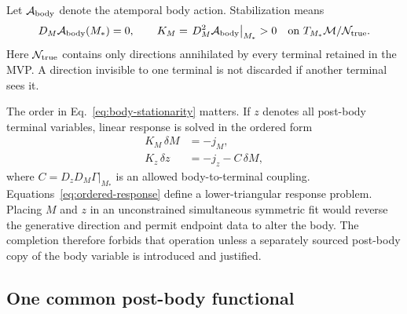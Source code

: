 \documentclass[11pt]{article}
\begin{document}
Let \(\mathcal A_{\rm body}\) denote the atemporal body action.  Stabilization
means
\begin{equation}
  D_M\mathcal A_{\rm body}(M_*)=0,
  \qquad
  K_M=\left.D_M^2\mathcal A_{\rm body}\right|_{M_*}>0
  \quad\text{on }T_{M_*}\mathcal M/\mathcal N_{\rm true}.
  \label{eq:body-stationarity}
\end{equation}
Here \(\mathcal N_{\rm true}\) contains only directions annihilated by every
terminal retained in the MVP.  A direction invisible to one terminal is not
discarded if another terminal sees it.

The order in Eq.~\eqref{eq:body-stationarity} matters.  If \(z\) denotes all
post-body terminal variables, linear response is solved in the ordered form
\begin{align}
  K_M\,\delta M &=-j_M,\\
  K_z\,\delta z &=-j_z-C\,\delta M,
  \label{eq:ordered-response}
\end{align}
where \(C=D_zD_M\Gamma|_{M_*}\) is an allowed body-to-terminal coupling.
Equations~\eqref{eq:ordered-response} define a lower-triangular response
problem.  Placing \(M\) and \(z\) in an unconstrained simultaneous symmetric
fit would reverse the generative direction and permit endpoint data to alter
the body.  The completion therefore forbids that operation unless a separately
sourced post-body copy of the body variable is introduced and justified.

\subsection{One common post-body functional}
\end{document}
